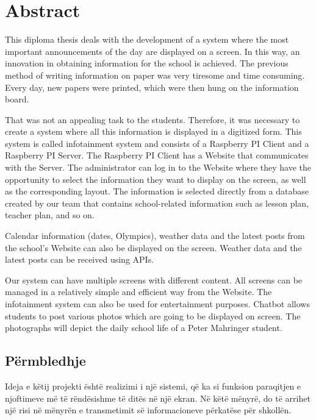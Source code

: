 \chapter*{Abstract}


This diploma thesis deals with the development of a system where the most important announcements of the day are displayed on a screen. In this way, an innovation in obtaining information for the school is achieved. The previous method of writing information on paper was very tiresome and time consuming. Every day, new papers were printed, which were then hung on the information board.  

That was not an appealing task to the students. Therefore, it was necessary to create a system where all this information is displayed in a digitized form. This system is called infotainment system and consists of a Raspberry PI Client and a Raspberry PI Server. The Raspberry PI Client has a Website that communicates with the Server. The administrator can log in to the Website where they have the opportunity to select the information they want to display on the screen, as well as the corresponding layout. The information is selected directly from a database created by our team that contains school-related information such as lesson plan, teacher plan, and so on.  

Calendar information (dates, Olympics), weather data and the latest posts from the school's Website can also be displayed on the screen. Weather data and the latest posts can be received using APIs.  

Our system can have multiple screens with different content. All screens can be managed in a relatively simple and efficient way from the Website. The infotainment system can also be used for entertainment purposes. Chatbot allows students to post various photos which are going to be displayed on screen. The photographs will depict the daily school life of a Peter Mahringer student.

\newpage
\section*{P\"{e}rmbledhje}

Ideja e k\"{e}tij projekti \"{e}sht\"{e} realizimi i nj\"{e} sistemi, q\"{e} ka si funksion paraqitjen e njoftimeve m\"{e} t\"{e} r\"{e}nd\"{e}sishme t\"{e} dit\"{e}s n\"{e} nj\"{e} ekran. N\"{e} k\"{e}t\"{e} m\"{e}nyr\"{e}, do t\"{e} arrihet nj\"{e} risi n\"{e} m\"{e}nyr\"{e}n e transmetimit s\"{e} informacioneve p\"{e}rkat\"{e}se p\"{e}r shkoll\"{e}n. 

